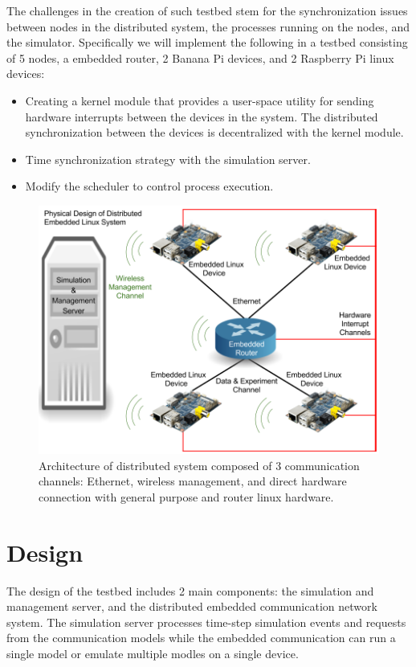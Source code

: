 The challenges in the creation of such testbed stem for the synchronization issues between nodes in the distributed system, the processes running on the nodes, and the simulator. Specifically we will implement the following in a testbed consisting of 5 nodes, a embedded router, 2 Banana Pi devices, and 2 Raspberry Pi linux devices:

\begin{itemize}
\item Creating a kernel module that provides a user-space utility for sending hardware interrupts between the devices in the system.
The distributed synchronization between the devices is decentralized with the kernel module.
  \item Time synchronization strategy with the simulation server.
  \item Modify the scheduler to control process execution.
\end{itemize}

\begin{figure}
  \centering
  \includegraphics[scale=0.28]{Updated_architecture_emb-vt.png}
  \caption{
    Architecture of distributed system composed of 3 communication channels: Ethernet, wireless management, and direct hardware connection with general purpose and router linux hardware.
    }
\end{figure}


\section{Design}
The design of the testbed includes 2 main components: the simulation and management server, and the distributed embedded communication network system. The simulation server processes time-step simulation events and requests from the communication models while the embedded communication can run a single model or emulate multiple modles on a single device.

